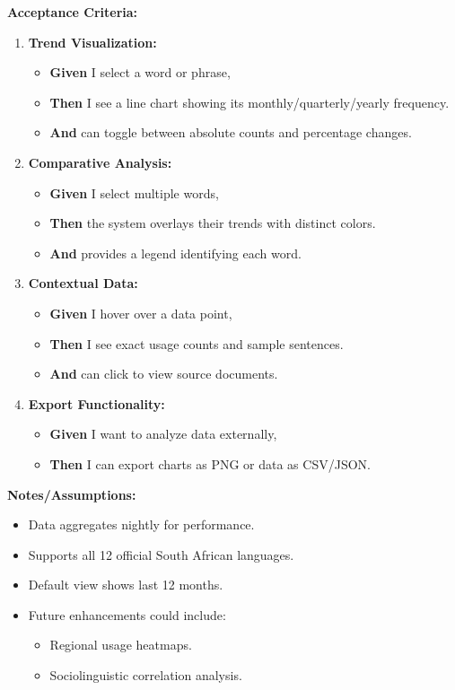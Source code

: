 \documentclass[12pt]{article}
\begin{document}
\vspace{1em}
\textbf{Acceptance Criteria:}
\begin{enumerate}
    \item \textbf{Trend Visualization:}
    \begin{itemize}
        \item \textbf{Given} I select a word or phrase,
        \item \textbf{Then} I see a line chart showing its monthly/quarterly/yearly frequency.
        \item \textbf{And} can toggle between absolute counts and percentage changes.
    \end{itemize}

    \item \textbf{Comparative Analysis:}
    \begin{itemize}
        \item \textbf{Given} I select multiple words,
        \item \textbf{Then} the system overlays their trends with distinct colors.
        \item \textbf{And} provides a legend identifying each word.
    \end{itemize}

    \item \textbf{Contextual Data:}
    \begin{itemize}
        \item \textbf{Given} I hover over a data point,
        \item \textbf{Then} I see exact usage counts and sample sentences.
        \item \textbf{And} can click to view source documents.
    \end{itemize}

    \item \textbf{Export Functionality:}
    \begin{itemize}
        \item \textbf{Given} I want to analyze data externally,
        \item \textbf{Then} I can export charts as PNG or data as CSV/JSON.
    \end{itemize}
\end{enumerate}

\vspace{1em}
\textbf{Notes/Assumptions:}
\begin{itemize}
    \item Data aggregates nightly for performance.
    \item Supports all 12 official South African languages.
    \item Default view shows last 12 months.
    \item Future enhancements could include:
    \begin{itemize}
        \item Regional usage heatmaps.
        \item Sociolinguistic correlation analysis.
    \end{itemize}
\end{itemize}
\end{document}
